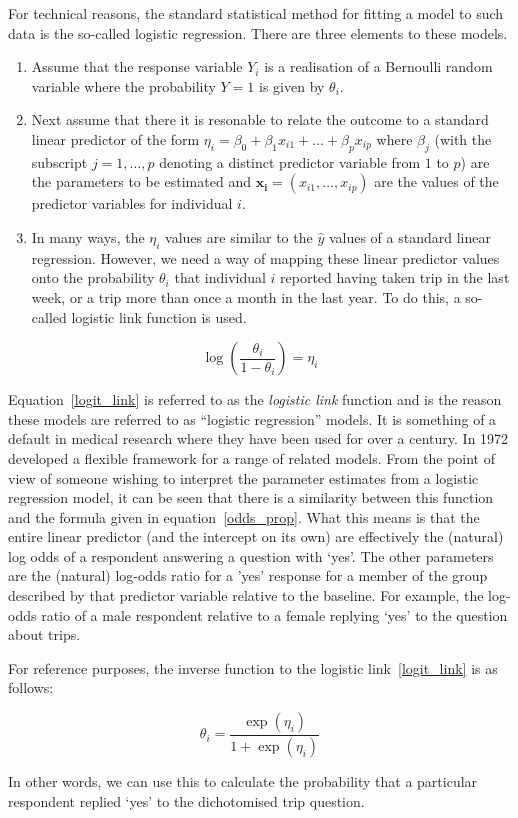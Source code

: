For technical reasons, the standard statistical method for fitting a model to
such data is the so-called logistic regression.   There are three elements
to these models.

\begin{enumerate}
\item Assume that the response variable $Y_i$ is a realisation of a
  Bernoulli random variable where the probability $Y=1$ is given by $\theta_i$.
\item Next assume that there it is resonable to relate the outcome
  to a standard linear predictor of the
  form $\eta_i = \beta_0 + \beta_1 x_{i1} + \ldots + \beta_p x_{ip}$ where
  $\beta_j$ (with the subscript $j=1, \ldots, p$ denoting a distinct predictor
  variable from $1$ to $p$) are the parameters to be estimated and
  $\boldsymbol{x_i}=(x_{i1}, \ldots, x_{ip})$ are the values of the predictor
  variables for individual $i$.
\item In many ways, the $\eta_i$ values are similar to the $\hat{y}$ values
  of a standard linear regression.  However, we need a way of mapping these
  linear predictor values onto the probability $\theta_i$ that individual $i$
  reported having taken trip in the last week, or a trip more than once a month
  in the last year.   To do this, a so-called logistic link function is used.
\end{enumerate}

\begin{equation}
\log \left( \frac{\theta_i}{1-\theta_i} \right) = \eta_i
\label{logit_link}
\end{equation}

Equation~\ref{logit_link} is referred to as the \emph{logistic link} function
and is the reason these models are referred to as ``logistic regression''
models. It is something of a default in medical research where they have been
used for over a century. In 1972 \cite{nelder1972generalized} developed a
flexible framework for a range of related models.   From the point of view
of someone wishing to interpret the parameter estimates from a logistic
regression model, it can be seen that there is a similarity between this
function and the formula given in equation~\ref{odds_prop}.   What this means
is that the entire linear predictor (and the intercept on its own) are
effectively the (natural) log odds of a respondent answering a question
with `yes'.   The other parameters are the (natural) log-odds ratio for a
'yes' response for a member of the group described by that predictor variable
relative to the baseline.   For example, the log-odds ratio of a male respondent relative to a female replying `yes' to the question about trips.


For reference purposes, the inverse function to the logistic
link~\ref{logit_link} is as follows:

\begin{displaymath}
\theta_i = \frac{\exp(\eta_i)}{1 + \exp(\eta_i)}
\end{displaymath}

In other words, we can use this to calculate the probability that a particular
respondent replied `yes' to the dichotomised trip question.


